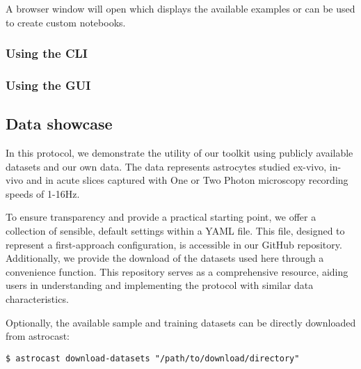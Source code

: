 A browser window will open which displays the available examples or can be used to create custom notebooks.

\subsubsection{Using the \ac{CLI}}

\subsubsection{Using the \ac{GUI}}

\subsection{Data showcase}

In this protocol, we demonstrate the utility of our toolkit using publicly available datasets and our own data.
The data represents astrocytes studied ex-vivo, in-vivo and in acute slices captured with One or Two Photon
microscopy recording speeds of 1-16Hz.

To ensure transparency and provide a practical starting point, we offer a collection of sensible, default settings
within a YAML file.
This file, designed to represent a first-approach configuration, is accessible in our GitHub repository.
Additionally, we provide the download of the datasets used here through a convenience function.
This repository serves as a comprehensive resource, aiding users in understanding and implementing the protocol with
similar data characteristics.


Optionally, the available sample and training datasets can be directly downloaded from astrocast:
\begin{lstlisting}[style=bashStyle]
    $ astrocast download-datasets "/path/to/download/directory"
\end{lstlisting}


